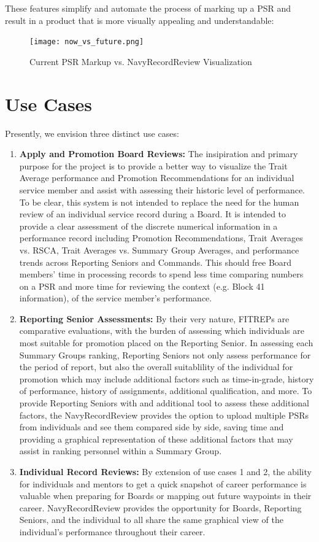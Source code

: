 \documentclass[UTF8]{article}
\begin{document}
\newpage

These features simplify and automate the process of marking up a PSR and result 
in a product that is more visually appealing and understandable:

\begin{figure}[h!]
  \centering
  \texttt{[image: now\_vs\_future.png]}
  \caption{Current PSR Markup vs. NavyRecordReview Visualization}
\end{figure}


\section{Use Cases}
Presently, we envision three distinct use cases:
\begin{enumerate}
  \item \textbf{Apply and Promotion Board Reviews:} The insipiration and primary purpose for the 
  project is to provide a better way to visualize the Trait Average performance 
  and Promotion Recommendations for an individual service member and assist with 
  assessing their historic level of performance. To be clear, this system is not 
  intended to replace the need for the human review of an individual service 
  record during a Board. It is intended to provide a clear assessment of the 
  discrete numerical information in a performance record including Promotion 
  Recommendations, Trait Averages vs. RSCA, Trait Averages vs. Summary Group 
  Averages, and performance trends across Reporting Seniors and Commands. This
  should free Board members' time in processing records to spend less time
  comparing numbers on a PSR and more time for reviewing the context (e.g. 
  Block 41 information), of the service member's performance.
  \item \textbf{Reporting Senior Assessments:} By their very nature, FITREPs are 
  comparative evaluations, with the burden of assessing which individuals are 
  most suitable for promotion placed on the Reporting Senior. In assessing each 
  Summary Groups ranking, Reporting Seniors not only assess performance for the 
  period of report, but also the overall suitablility of the individual for 
  promotion which may include additional factors such as time-in-grade, history 
  of performance, history of assignments, additional qualification, and more. To 
  provide Reporting Seniors with and additional tool to assess these additional 
  factors, the NavyRecordReview provides the option to upload multiple PSRs from
  individuals and see them compared side by side, saving time and providing a
  graphical representation of these additional factors that may assist in ranking
  personnel within a Summary Group.
  \item \textbf{Individual Record Reviews:} By extension of use cases 1 and 2, the
  ability for individuals and mentors to get a quick snapshot of career 
  performance is valuable when preparing for Boards or mapping out future
  waypoints in their career. NavyRecordReview provides the opportunity for 
  Boards, Reporting Seniors, and the individual to all share the same graphical
  view of the individual's performance throughout their career.
\end{enumerate}
\end{document}
